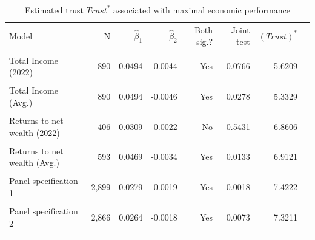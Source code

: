 \begin{table}[htbp]\centering\small
\caption{Estimated trust \(\textit{Trust}^*\) associated with maximal economic performance}
\label{tab:trust_turning_points_original_results}
\begin{tabular}{lrrrrrrr}\toprule
Model & N & \(\hat\beta_1\) & \(\hat\beta_2\) & Both sig.? & Joint test & \((\textit{Trust})^*\) \\\\ \midrule
Total Income (2022) & 890 & 0.0494 & -0.0044 & Yes & 0.0766 & 5.6209 \\\\
Total Income (Avg.) & 890 & 0.0494 & -0.0046 & Yes & 0.0278 & 5.3329 \\\\
Returns to net wealth (2022) & 406 & 0.0309 & -0.0022 & No & 0.5431 & 6.8606 \\\\
Returns to net wealth (Avg.) & 593 & 0.0469 & -0.0034 & Yes & 0.0133 & 6.9121 \\\\
Panel specification 1 & 2,899 & 0.0279 & -0.0019 & Yes & 0.0018 & 7.4222 \\\\
Panel specification 2 & 2,866 & 0.0264 & -0.0018 & Yes & 0.0073 & 7.3211 \\\\
\bottomrule
\end{tabular}
\end{table}
